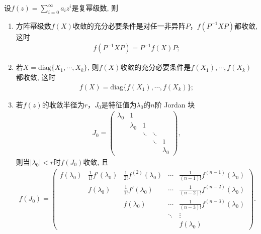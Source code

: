 \documentclass[../../main.tex]{subfiles}%
\begin{document}
\begin{theorem}\label{theorem:方阵幂级数收敛的条件}
设\(f(z)=\sum_{i = 0}^{\infty}a_{i}z^{i}\)是复幂级数, 则
\begin{enumerate}[(1)]
\item 方阵幂级数\(f(X)\)收敛的充分必要条件是对任一非异阵\(P\)，\(f(P^{-1}XP)\)都收敛, 这时
\begin{align*}
f(P^{-1}XP) = P^{-1}f(X)P;
\end{align*}

\item 若\(X = \mathrm{diag}\{X_1,\cdots,X_k\}\), 则\(f(X)\)收敛的充分必要条件是\(f(X_1),\cdots,f(X_k)\)都收敛, 这时
\begin{align*}
f(X) = \mathrm{diag}\{f(X_1),\cdots,f(X_k)\};
\end{align*}

\item 若\(f(z)\)的收敛半径为\(r\)，\(J_0\)是特征值为\(\lambda_0\)的\(n\)阶 Jordan 块
\begin{align*}
J_0 = \begin{pmatrix}
\lambda_0 & 1 & & \\
 & \lambda_0 & 1 & \\
 & & \ddots & \ddots \\
 & & & \ddots & 1 \\
 & & & & \lambda_0
\end{pmatrix},
\end{align*}
则当\(|\lambda_0| < r\)时\(f(J_0)\)收敛, 且
\begin{align}\label{equation:::::7.8.6}
f(J_0) = \begin{pmatrix}
f(\lambda_0) & \frac{1}{1!}f'(\lambda_0) & \frac{1}{2!}f^{(2)}(\lambda_0) & \cdots & \frac{1}{(n - 1)!}f^{(n - 1)}(\lambda_0) \\
 & f(\lambda_0) & \frac{1}{1!}f'(\lambda_0) & \cdots & \frac{1}{(n - 2)!}f^{(n - 2)}(\lambda_0) \\
 & & f(\lambda_0) & \cdots & \frac{1}{(n - 3)!}f^{(n - 3)}(\lambda_0) \\
 & & & \ddots & \vdots \\
 & & & & f(\lambda_0)
\end{pmatrix}.
\end{align} 
\end{enumerate}
\end{theorem}
\end{document}

